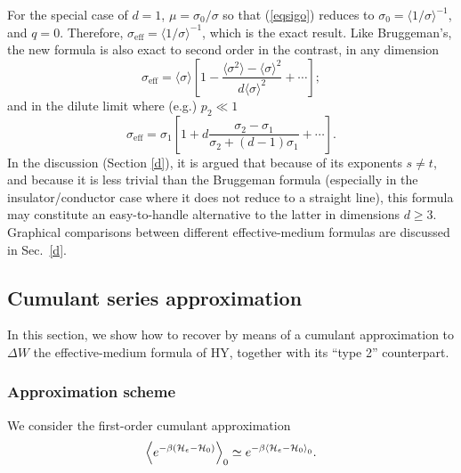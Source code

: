 For the special case of $d=1$, $\mu=\sigma_0/\sigma$ so that 
(\ref{eqsigo}) reduces to $\sigma_0=\langle1/\sigma\rangle^{-1}$, 
and $q=0$. Therefore, $\sigma_{\text{eff}}=\langle1/\sigma\rangle^{-1}$, 
which is the exact result. Like Bruggeman's, the new formula 
is also exact to second order in the 
contrast, in any dimension
\begin{equation}
\label{wcl}
\sigma_{\text{eff}}=\langle\sigma\rangle\left[1-\frac{\langle
\sigma^2\rangle-\langle\sigma\rangle^2}{d\langle\sigma\rangle^2}
+\cdots\right];
\end{equation}
and in the dilute limit where (e.g.) $p_2\ll 1$
\begin{equation}
\label{dl}
\sigma_{\text{eff}}=\sigma_1\left[1+d\frac{\sigma_2-\sigma_1}
{\sigma_2+(d-1)\sigma_1}+\cdots\right].
\end{equation}
In the discussion (Section \ref{d}), it is argued that because 
of its exponents $s\not= t$, and because it is less trivial than 
the Bruggeman formula (especially in the insulator/conductor case 
where it does not reduce to a straight line), this formula may 
constitute an easy-to-handle alternative to the latter in dimensions 
$d\geq 3$. Graphical comparisons between different effective-medium 
formulas are discussed in Sec.\ \ref{d}.


\subsection{Cumulant series approximation}
\label{asa}

In this section, we show how to recover by means of a cumulant
approximation to $\Delta W$ the effective-medium formula of HY,
together with its ``type 2'' counterpart.

\subsubsection{Approximation scheme}
We consider the first-order cumulant approximation
\begin{equation}
\label{cumul}
\left\langle
e^{-\beta({\cal H}_e-{\cal H}_0)}
\right\rangle_0\simeq
e^{-\beta\left\langle{\cal H}_e-{\cal H}_0\right\rangle_0}.
\end{equation}

